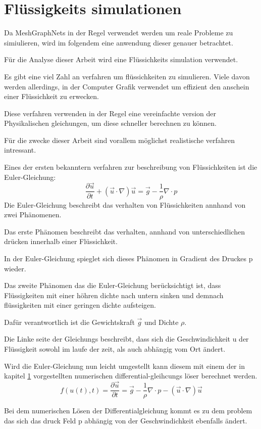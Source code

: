 
\section{Flüssigkeits simulationen}

Da MeshGraphNets in der Regel verwendet werden um reale Probleme zu simiulieren, 
wird im folgendem eine anwendung dieser genauer betrachtet.

Für die Analyse dieser Arbeit wird eine Flüssichkeits simulation verwendet.

Es gibt eine viel Zahl an verfahren um flüssichkeiten zu simulieren.
Viele davon werden allerdings, in der Computer Grafik verwendet um 
effizient den anschein einer Flüssichkeit zu erwecken.

Diese verfahren verwenden in der Regel eine vereinfachte version der Physikalischen gleichungen,
um diese schneller berechnen zu können.

Für die zwecke dieser Arbeit sind vorallem möglichst realistische verfahren intressant.

Eines der ersten bekanntern verfahren zur beschreibung von Flüssichkeiten ist die Euler-Gleichung:
$$
\frac{\partial \vec{u}}{\partial t} + (\vec{u} \cdot \nabla) \vec{u} =  \vec{g} - \frac{1}{\rho} \nabla \cdot p
$$
Die Euler-Gleichung beschreibt das verhalten von Flüssichkeiten annhand von zwei Phänomenen.

Das erste Phänomen beschreibt das verhalten, annhand von unterschiedlichen drücken innerhalb einer Flüssichkeit.

In der Euler-Gleichung spieglet sich dieses Phänomen in Gradient des Druckes p wieder.

Das zweite Phänomen das die Euler-Gleichung berücksichtigt ist, dass Flüssigkeiten mit
einer höhren dichte nach untern sinken und demnach flüssigkeiten mit einer geringen dichte aufsteigen.

Dafür verantwortlich ist die Gewichtskraft $\vec{g}$ und Dichte $\rho$.

Die Linke seite der Gleichungs beschreibt, dass sich die Geschwindichkeit u der Flüssigkeit sowohl im laufe 
der zeit, als auch abhängig vom Ort ändert.

Wird die Euler-Gleichung nun leicht umgestellt kann diesem mit einem der in kapitel \ref{} vorgestellten 
numerischen differential-gleihcungs löser berechnet werden.
$$
f(u(t), t) = \frac{\partial \vec{u}}{\partial t}  =  \vec{g} - \frac{1}{\rho} \nabla \cdot p -  (\vec{u} \cdot \nabla) \vec{u}
$$

Bei dem numerischen Lösen der Differentialgleichung kommt es zu dem problem das sich das druck Feld p
abhängig von der Geschwindichkeit ebenfalls ändert.

